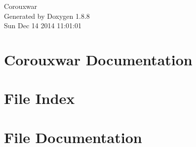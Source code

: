 \documentclass[twoside]{book}
\newcommand{\+}{\discretionary{\mbox{\scriptsize$\hookleftarrow$}}{}{}}
\newcommand{\clearemptydoublepage}{%
  \newpage{\pagestyle{empty}\cleardoublepage}%
}
\begin{document}
\hypersetup{pageanchor=false,
             bookmarks=true,
             bookmarksnumbered=true,
             pdfencoding=unicode
            }
\begin{titlepage}
\vspace*{7cm}
\begin{center}%
{\Large Corouxwar }\\
\vspace*{1cm}
{\large Generated by Doxygen 1.8.8}\\
\vspace*{0.5cm}
{\small Sun Dec 14 2014 11:01:01}\\
\end{center}
\end{titlepage}
\clearemptydoublepage
\tableofcontents
\clearemptydoublepage
{}
\hypersetup{pageanchor=true}

\chapter{Corouxwar Documentation}
\label{index}\hypertarget{index}{}
\chapter{File Index}

\chapter{File Documentation}











































\backmatter
\newpage
{}
\clearemptydoublepage
{}
\printindex
\end{document}
